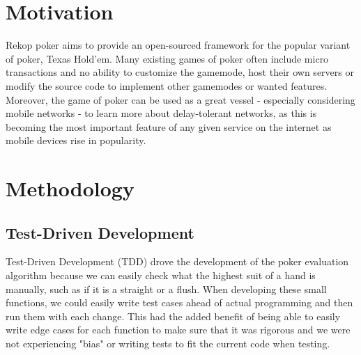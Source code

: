 \documentclass[11pt]{article}
\begin{document}

\newpage
\section{Motivation}



Rekop poker aims to provide an open-sourced framework for the popular variant of poker, Texas Hold'em. Many existing games of poker often include micro transactions and no ability to customize the gamemode, host their own servers or modify the source code to implement other gamemodes or wanted features. Moreover, the game of poker can be used as a great vessel - especially considering mobile networks - to learn more about delay-tolerant networks, as this is becoming the most important feature of any given service on the internet as mobile devices rise in popularity. 

\section{Methodology}

\subsection{Test-Driven Development}

Test-Driven Development (TDD) drove the development of the poker evaluation algorithm because we can easily check what the highest suit of a hand is manually, such as if it is a straight or a flush. When developing these small functions, we could easily write test cases ahead of actual programming and then run them with each change. This had the added benefit of being able to easily write edge cases for each function to make sure that it was rigorous and we were not experiencing "bias" or writing tests to fit the current code when testing.  \\
\end{document}

